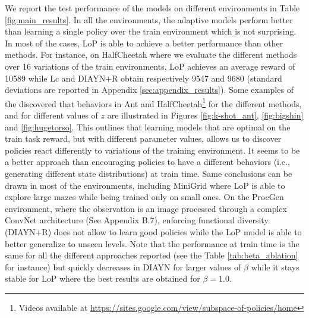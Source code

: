 




We report the test performance of the models on different environments in Table \ref{fig:main_results}. %
In all the environments, the adaptive models perform better than learning a single policy over the train environment which is not surprising. In most of the cases, LoP is able to achieve a better performance than other methods. For instance, on HalfCheetah where we evaluate the different methods over 16 variations of the train environments, LoP achieves an average reward of 10589 while Lc  and DIAYN+R obtain respectively 9547 and 9680 (standard deviations are reported in Appendix \ref{sec:appendix_results}). Some examples of the discovered that behaviors in Ant and HalfCheetah\footnote{Videos available at \url{https://sites.google.com/view/subspace-of-policies/home}} for the different methods, and for different values of $z$ are illustrated in Figures \ref{fig:k-shot_ant}, \ref{fig:bigshin} and \ref{fig:hugetorso}.
This outlines that learning models that are optimal on the train task reward, but with different parameter values, allows us to discover policies react differently to variations of the training environment. It seems to be a better approach than encouraging policies to have a different behaviors (i.e., generating different state distributions) at train time. Same conclusions can be drawn in most of the environments, including MiniGrid where LoP is able to explore large mazes while being trained only on small ones. On the ProcGen environment, where the observation is an image processed through a complex ConvNet architecture (See Appendix B.7), enforcing functional diversity (DIAYN+R) does not allow to learn good policies while the LoP model is able to better generalize to unseen levels. Note that the performance at train time is the same for all the different approaches reported  (see the Table \ref{tab:beta_ablation} for instance) but quickly decreases in DIAYN for larger values of $\beta$ while it stays stable for LoP where the best results are obtained for $\beta=1.0$.

